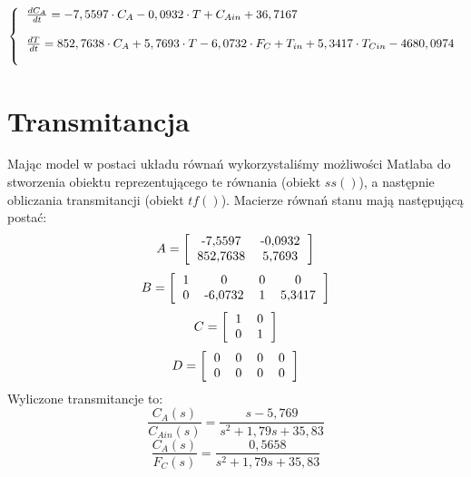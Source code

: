 \begin{equation}
\left\{
\begin{tabular}{l}
$\frac{dC_A}{dt} = -7,5597\cdot C_A-0,0932\cdot T+C_{Ain} + 36,7167$\\\\
$\frac{dT}{dt} = 852,7638\cdot C_A + 5,7693\cdot T -6,0732\cdot F_C + T_{in} + 5,3417\cdot T_{Cin} - 4680,0974$\\\\
\end{tabular}
\right.
\end{equation}
\newpage
\section{Transmitancja}
Mając model w postaci układu równań wykorzystaliśmy możliwości Matlaba do stworzenia obiektu reprezentującego te równania (obiekt $ss()$), a następnie obliczania transmitancji (obiekt $tf()$). Macierze równań stanu mają następującą postać:
\begin{equation}
	A=\left[
	\begin{tabular}{c c}
	-7,5597&-0,0932\\852,7638&5,7693
	\end{tabular}
	\right]
\end{equation}
\begin{equation}
B=\left[
\begin{tabular}{c c c c}
1&0&0&0\\0&-6,0732&1&5,3417
\end{tabular}
\right]
\end{equation}
\begin{equation}
C=\left[
\begin{tabular}{c c}
1&0\\0&1
\end{tabular}
\right]
\end{equation}
\begin{equation}
D=\left[
\begin{tabular}{c c c c}
0&0&0&0\\0&0&0&0
\end{tabular}
\right]
\end{equation}
Wyliczone transmitancje to:
\begin{equation}
	\frac{C_A(s)}{C_{Ain}(s)} = \frac{s-5,769}{s^2+1,79s+35,83}
\end{equation}
\begin{equation}
\frac{C_A(s)}{F_C(s)} = \frac{0,5658}{s^2+1,79s+35,83}
\end{equation}

